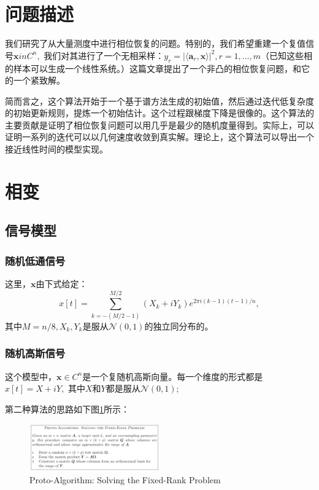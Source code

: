 \documentclass[12pt,letterpaper]{article}
\begin{document}
\section*{问题描述}

我们研究了从大量测度中进行相位恢复的问题。特别的，我们希望重建一个复值信号$\mathbf{x}in C^n,$ 我们对其进行了一个无相采样：$y_r = |\langle \mathbf{a}_r,\mathbf{x}\rangle|^2, r = 1,\dots,m$（已知这些相的样本可以生成一个线性系统。）这篇文章提出了一个非凸的相位恢复问题，和它的一个紧致解。

简而言之，这个算法开始于一个基于谱方法生成的初始值，然后通过迭代低复杂度的初始更新规则，提炼一个初始估计。这个过程跟梯度下降是很像的。这个算法的主要贡献是证明了相位恢复问题可以用几乎是最少的随机度量得到。实际上，可以证明一系列的迭代可以以几何速度收敛到真实解。理论上，这个算法可以导出一个接近线性时间的模型实现。

\section*{相变}

\subsection*{信号模型}

\subsubsection*{随机低通信号}

这里，$\mathbf{x}$由下式给定：
$$x[t]=\sum_{k=-(M/2-1)}^{M/2} (X_k+iY_k) e^{2\pi i(k-1)(t-1)/n},$$
其中$M = n/8, X_k,Y_k$是服从$\mathcal{N}(0,1)$的独立同分布的。

\subsubsection*{随机高斯信号}

这个模型中，$\mathbf{x} \in C^n$是一个复随机高斯向量。每一个维度的形式都是$x[t] = X+iY,$ 其中$X$和$Y$都是服从$\mathcal{N}(0,1)$;

第二种算法的思路如下图\ref{pasfrp}所示：

\begin{figure}[h]
    \centering
    \includegraphics[width = 0.5\textwidth]{randomizedprototype.png}
    \caption{Proto-Algorithm: Solving the Fixed-Rank Problem}
    \label{pasfrp}
\end{figure}
\end{document}
